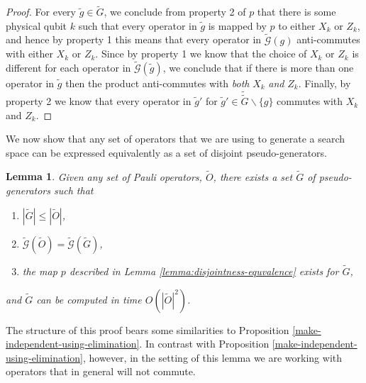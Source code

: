 \documentclass[twocolumn,showpacs,preprintnumbers,amsmath,amssymb,nofootinbib,pra,floatfix]{revtex4-1}
\newtheorem{lemma}{Lemma}
\newenvironment{remark}[1][Remark]{\begin{trivlist}
\item[\hskip \labelsep {\bfseries #1}]}{\end{trivlist}}
\newcommand{\set}{\tilde}
\newcommand{\genfun}{\tilde{\mathcal{G}}}
\begin{document}
\begin{proof}
For every $\set g\in\set G$, we conclude from property 2 of $p$ that there is some physical qubit $k$ such that every operator in $\set g$ is mapped by $p$ to either $X_k$ or $Z_k$, and hence by property 1 this means that every operator in $\genfun(g)$ anti-commutes with either $X_k$ or $Z_k$.  Since by property 1 we know that the choice of $X_k$ or $Z_k$ is different for each operator in $\genfun(\set g)$, we conclude that if there is more than one operator in $\set g$ then the product anti-commutes with \emph{both} $X_k$ \emph{and} $Z_k$.  Finally, by property 2 we know that every operator in $\set g'$ for $\set g'\in\set \set G\backslash\{g\}$ commutes with $X_k$ and $Z_k$.
\end{proof}

\begin{remark}
We now show that any set of operators that we are using to generate a search space can be expressed equivalently as a set of disjoint pseudo-generators.
\end{remark}

\begin{lemma}
\label{lemma:computing-disjoint-pseudo-generators}
Given any set of Pauli operators, $\set O$, there exists a set $\set G$ of pseudo-generators such that
\begin{enumerate}
\item $|\set G|\le|\set O|$,
\item $\genfun(\set O)=\genfun(\set G)$,
\item the map $p$ described in Lemma \ref{lemma:disjointness-equvalence} exists for $\set G$,
\end{enumerate}
and $\set G$ can be computed in time $O(|\set O|^2)$.
\end{lemma}

\begin{remark}
The structure of this proof bears some similarities to Proposition \ref{make-independent-using-elimination}.  In contrast with Proposition \ref{make-independent-using-elimination}, however, in the setting of this lemma we are working with operators that in general will not commute.
\end{remark}
\end{document}
